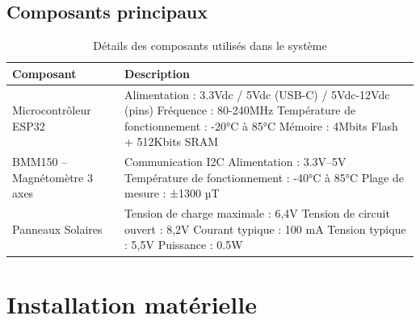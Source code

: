 \documentclass[a4paper,12pt]{article}
\begin{document}
\subsection{Composants principaux}
\begin{table}[H]
\centering
\renewcommand{\arraystretch}{1.3}
\begin{tabular}{|>{\raggedright\arraybackslash}m{4.5cm}|>{\raggedright\arraybackslash}m{8.5cm}|}
\hline
\rowcolor{blue!30}
\textbf{Composant} & \textbf{Description} \\
\hline
\rowcolor{blue!10}
Microcontrôleur ESP32 & Alimentation : 3.3Vdc / 5Vdc (USB-C) / 5Vdc-12Vdc (pins) \newline Fréquence : 80-240MHz \newline Température de fonctionnement : -20°C à 85°C \newline Mémoire : 4Mbits Flash + 512Kbits SRAM \\

\rowcolor{blue!5}
BMM150 – Magnétomètre 3 axes & Communication I2C \newline Alimentation : 3.3V–5V \newline Température de fonctionnement : -40°C à 85°C \newline Plage de mesure : ±1300 µT \\

\rowcolor{blue!10}
Panneaux Solaires & Tension de charge maximale : 6,4V \newline Tension de circuit ouvert : 8,2V \newline Courant typique : 100 mA \newline Tension typique : 5,5V \newline Puissance : 0.5W \\
\hline
\end{tabular}
\caption{Détails des composants utilisés dans le système}
\label{tab:specs}
\end{table}


\section{Installation matérielle}
\end{document}
